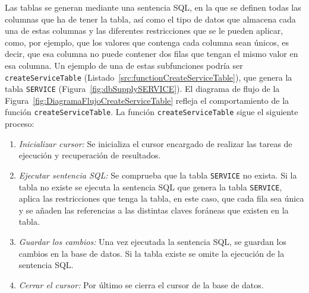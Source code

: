 Las tablas se generan mediante una sentencia \acrshort{SQL}, en la que se definen todas las columnas que ha de tener la tabla, así como el tipo de datos que almacena cada una de estas columnas y las diferentes restricciones que se le pueden aplicar, como, por ejemplo, que los valores que contenga cada columna sean únicos, es decir, que esa columna no puede contener dos filas que tengan el mismo valor en esa columna. Un ejemplo de una de estas subfunciones podría ser \texttt{createServiceTable} (Listado~\ref{src:functionCreateServiceTable}), que genera la tabla \texttt{SERVICE} (Figura~\ref{fig:dbSupplySERVICE}). El diagrama de flujo de la Figura~\ref{fig:DiagramaFlujoCreateServiceTable} refleja el comportamiento de la función \texttt{createServiceTable}. La función \texttt{createServiceTable} sigue el siguiente proceso:
\begin{enumerate}
    \item \textit{Inicializar cursor:} Se inicializa el cursor encargado de realizar las tareas de ejecución y recuperación de resultados.
    \item \textit{Ejecutar sentencia \acrshort{SQL}:} Se comprueba que la tabla \texttt{SERVICE} no exista. Si la tabla no existe se ejecuta la sentencia \acrshort{SQL} que genera la tabla \texttt{SERVICE}, aplica las restricciones que tenga la tabla, en este caso, que cada fila sea única y se añaden las referencias a las distintas claves foráneas que existen en la tabla.
    \item \textit{Guardar los cambios:} Una vez ejecutada la sentencia \acrshort{SQL}, se guardan los cambios en la base de datos. Si la tabla existe se omite la ejecución de la sentencia \acrshort{SQL}.
    \item \textit{Cerrar el cursor:} Por último se cierra el cursor de la base de datos.
\end{enumerate}

